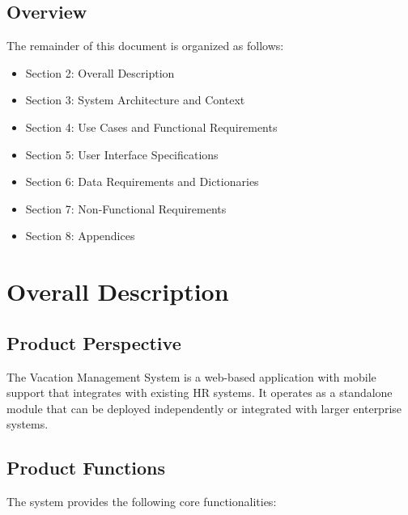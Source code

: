 \documentclass[12pt,a4paper]{article}
\begin{document}
\subsection{Overview}
The remainder of this document is organized as follows:
\begin{itemize}
    \item Section 2: Overall Description
    \item Section 3: System Architecture and Context
    \item Section 4: Use Cases and Functional Requirements
    \item Section 5: User Interface Specifications
    \item Section 6: Data Requirements and Dictionaries
    \item Section 7: Non-Functional Requirements
    \item Section 8: Appendices
\end{itemize}

\section{Overall Description}

\subsection{Product Perspective}
The Vacation Management System is a web-based application with mobile support that integrates with existing HR systems. It operates as a standalone module that can be deployed independently or integrated with larger enterprise systems.

\subsection{Product Functions}
The system provides the following core functionalities:
\end{document}
